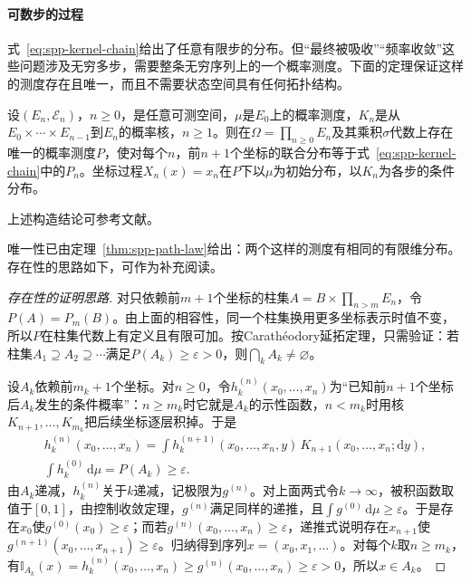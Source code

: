 \paragraph{可数步的过程}
式~\eqref{eq:spp-kernel-chain}给出了任意有限步的分布。但“最终被吸收”“频率收敛”这些问题涉及无穷多步，需要整条无穷序列上的一个概率测度。下面的定理保证这样的测度存在且唯一，而且不需要状态空间具有任何拓扑结构。

\begin{theorem}
\label{thm:spp-ionescu-tulcea}
设$(E_n,\mathcal E_n)$，$n\ge0$，是任意可测空间，$\mu$是$E_0$上的概率测度，$K_n$是从$E_0\times\cdots\times E_{n-1}$到$E_n$的概率核，$n\ge1$。则在$\Omega=\prod_{n\ge0}E_n$及其乘积$\sigma$代数上存在唯一的概率测度$P$，使对每个$n$，前$n+1$个坐标的联合分布等于式~\eqref{eq:spp-kernel-chain}中的$P_n$。坐标过程$X_n(x)=x_n$在$P$下以$\mu$为初始分布，以$K_n$为各步的条件分布。
\end{theorem}

上述构造结论可参考文献。

唯一性已由定理~\ref{thm:spp-path-law}给出：两个这样的测度有相同的有限维分布。存在性的思路如下，可作为补充阅读。

\begin{proof}[存在性的证明思路]
对只依赖前$m+1$个坐标的柱集$A=B\times\prod_{n>m}E_n$，令$P(A)=P_m(B)$。由上面的相容性，同一个柱集换用更多坐标表示时值不变，所以$P$在柱集代数上有定义且有限可加。按Carathéodory延拓定理，只需验证：若柱集$A_1\supseteq A_2\supseteq\cdots$满足$P(A_k)\ge\varepsilon>0$，则$\bigcap_kA_k\ne\varnothing$。

设$A_k$依赖前$m_k+1$个坐标。对$n\ge0$，令$h_k^{(n)}(x_0,\ldots,x_n)$为“已知前$n+1$个坐标后$A_k$发生的条件概率”：$n\ge m_k$时它就是$A_k$的示性函数，$n<m_k$时用核$K_{n+1},\ldots,K_{m_k}$把后续坐标逐层积掉。于是
\begin{gather*}
  h_k^{(n)}(x_0,\ldots,x_n)=\int h_k^{(n+1)}(x_0,\ldots,x_n,y)\,K_{n+1}(x_0,\ldots,x_n;\mathrm dy),\\
  \int h_k^{(0)}\,\mathrm d\mu=P(A_k)\ge\varepsilon .
\end{gather*}
由$A_k$递减，$h_k^{(n)}$关于$k$递减，记极限为$g^{(n)}$。对上面两式令$k\to\infty$，被积函数取值于$[0,1]$，由控制收敛定理，$g^{(n)}$满足同样的递推，且$\int g^{(0)}\,\mathrm d\mu\ge\varepsilon$。于是存在$x_0$使$g^{(0)}(x_0)\ge\varepsilon$；而若$g^{(n)}(x_0,\ldots,x_n)\ge\varepsilon$，递推式说明存在$x_{n+1}$使$g^{(n+1)}(x_0,\ldots,x_{n+1})\ge\varepsilon$。归纳得到序列$x=(x_0,x_1,\ldots)$。对每个$k$取$n\ge m_k$，有$\mathbb I_{A_k}(x)=h_k^{(n)}(x_0,\ldots,x_n)\ge g^{(n)}(x_0,\ldots,x_n)\ge\varepsilon>0$，所以$x\in A_k$。
\end{proof}

